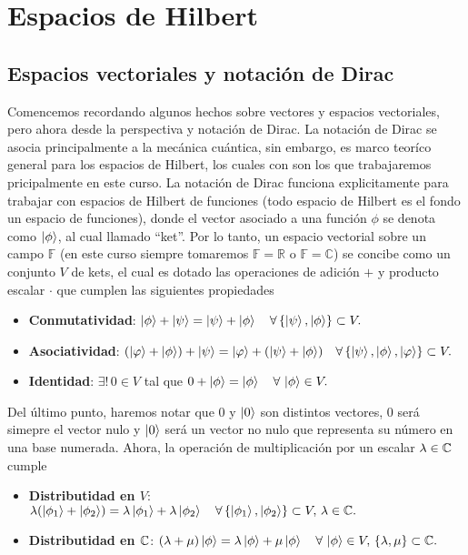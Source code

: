\documentclass[main.tex]{subfiles}
\begin{document}
\chapter{Espacios de Hilbert}\label{cap1}

\section{Espacios vectoriales y notación de Dirac}

\noindent Comencemos recordando algunos hechos sobre vectores y espacios vectoriales, pero ahora desde la perspectiva y notación de Dirac. La notación de Dirac se asocia principalmente a la mecánica cuántica, sin embargo, es marco teoríco general para los espacios de Hilbert, los cuales con son los que trabajaremos pricipalmente en este curso. La notación de Dirac funciona explicitamente para trabajar con espacios de Hilbert de funciones (todo espacio de Hilbert es el fondo un espacio de funciones), donde el vector asociado a una función $\phi$ se denota como $\ket{\phi}$, al cual llamado ``ket''. Por lo tanto, un espacio vectorial sobre un campo \(\mathbb{F}\) (en este curso siempre tomaremos \(\mathbb{F} = \mathbb{R}\) o \(\mathbb{F} = \mathbb{C}\)) se concibe como un conjunto \(V\) de kets, el cual es dotado las operaciones de adición \(+\) y producto escalar \(\cdot\) que cumplen las siguientes propiedades

\begin{itemize}
    \item \textbf{Conmutatividad}: \(\ket{\phi} + \ket{\psi} = \ket{\psi} + \ket{\phi}\quad\forall\,\{\ket{\psi},\ket{\phi}\}\subset V.\)
    \item \textbf{Asociatividad}: \((\ket{\varphi}+\ket{\phi}) + \ket{\psi} = \ket{\varphi}+(\ket{\psi} + \ket{\phi})\quad\forall\,\{\ket{\psi},\ket{\phi},\ket{\varphi}\}\subset V.\)
    \item \textbf{Identidad}: \(\exists! \, 0 \in V\) tal que \(0 + \ket{\phi} = \ket{\phi}\quad\forall\,\ket{\phi}\in V.\)
\end{itemize}

Del último punto, haremos notar que $0$ y $\ket{0}$ son distintos vectores, $0$ será simepre el vector nulo y $\ket{0}$ será un vector no nulo que representa su número en una base numerada. Ahora, la operación de multiplicación por un escalar \(\lambda \in \mathbb C \) cumple

\begin{itemize}
    \item \textbf{Distributidad en \(V\)}: \(\lambda(\ket{\phi_1} + \ket{\phi_2}) = \lambda\ket{\phi_1} + \lambda\ket{\phi_2}\quad\forall\,\{\ket{\phi_1},\ket{\phi_2}\}\subset V,\,\lambda\in\mathbb C .\)
    \item \textbf{Distributidad en \(\mathbb C \)}: \((\lambda + \mu)\ket{\phi} = \lambda\ket{\phi} + \mu\ket{\phi}\quad\forall\,\ket{\phi}\in V,\,\{\lambda,\mu\}\subset\mathbb C .\)
\end{itemize}
\end{document}
